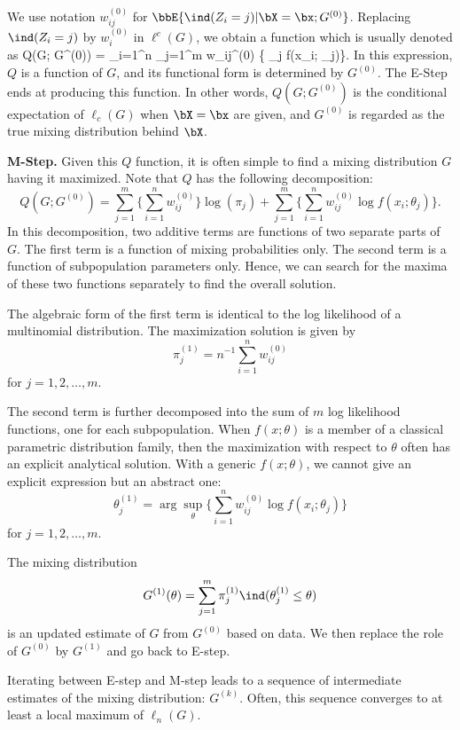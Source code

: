 We use notation $w_{ij}^{(0)}$ for $\bbE \{\ind(Z_i = j) |  \bX=\bx;  G^{(0)}\}$.
Replacing $\ind(Z_i = j)$ by $w_i^{(0)}$ in $\ell^c(G)$, we obtain
a function which is usually denoted as
\be
\label{EM.eq1}
Q(G; G^{(0)}) = \sum_{i=1}^n \sum_{j=1}^m w_{ij}^{(0)} \log \{ \pi_j f(x_{i}; \theta_j)\}.
\ee
In this expression, $Q$ is a function of $G$, 
and its functional form is determined by $G^{(0)}$.
The E-Step ends at producing this function.
In other words, $Q(G; G^{(0)})$ is the conditional expectation of
$\ell_c(G)$ when $\bX = \bx$ are given, and $G^{(0)}$ is regarded
as the true mixing distribution behind $\bX$.

\vs
\noindent
{\bf M-Step.} Given this $Q$ function, it is often simple to find a mixing distribution $G$
having it maximized. Note that $Q$ has the following decomposition:
\[
Q(G; G^{(0)}) 
= \sum_{j=1}^m \big \{ \sum_{i=1}^n w_{ij}^{(0)}\big \} \log (\pi_j)
+ 
\sum_{j=1}^m \big \{  \sum_{i=1}^n w_{ij}^{(0)} \log f(x_{i}; \theta_j) \big \}.
\]
In this decomposition, two additive terms are functions of two separate
parts of $G$.
The first term is a function of mixing probabilities only.
The second term is a function of subpopulation parameters only.
Hence, we can search for the maxima of these two functions
separately to find the overall solution.

The algebraic form of the first term is identical to the log likelihood of 
a multinomial distribution.
The maximization solution is given by
\[
\pi_j^{(1)} = n^{-1} \sum_{i=1}^n w_{ij}^{(0)}
\]
for $j=1, 2, \ldots, m$.

The second term is further decomposed into the sum of $m$
log likelihood functions, one for each subpopulation.
When $f(x; \theta)$ is a member of a classical parametric distribution
family, then the maximization with respect to $\theta$ often has
an explicit analytical solution.  With a generic $f(x; \theta)$, we cannot give
an explicit expression but an abstract one:
\[
\theta_j^{(1)} = \arg \sup_\theta \{  \sum_{i=1}^n w_{ij}^{(0)} \log f(x_{i}; \theta_j) \}
\]
for $j=1, 2, \ldots, m$.

The mixing distribution
\[
G^{(1)}(\theta) = \sum_{j=1}^m \pi_j^{(1)} \ind (\theta_j^{(1)} \leq \theta)
\]
is an updated estimate of $G$ from $G^{(0)}$ based on data.
We then replace the role of $G^{(0)}$ by $G^{(1)}$ and go back to E-step.

Iterating between E-step and M-step leads to a sequence of
intermediate estimates of the mixing distribution: $G^{(k)}$. 
Often, this sequence converges
to at least a local maximum of $\ell_n(G)$.

